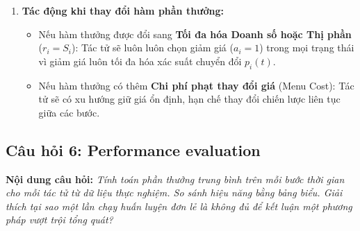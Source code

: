 \documentclass[12pt,a4paper]{article}
\begin{document}
\begin{enumerate}
    \item \textbf{Tác động khi thay đổi hàm phần thưởng:}
    \begin{itemize}
        \item Nếu hàm thưởng được đổi sang \textbf{Tối đa hóa Doanh số hoặc Thị phần} ($r_i = S_i$): Tác tử sẽ luôn luôn chọn giảm giá ($a_i = 1$) trong mọi trạng thái vì giảm giá luôn tối đa hóa xác suất chuyển đổi $p_i(t)$.
        \item Nếu hàm thưởng có thêm \textbf{Chi phí phạt thay đổi giá} (Menu Cost): Tác tử sẽ có xu hướng giữ giá ổn định, hạn chế thay đổi chiến lược liên tục giữa các bước.
    \end{itemize}
\end{enumerate}

\subsection{Câu hỏi 6: Performance evaluation}
\textbf{Nội dung câu hỏi:} \textit{Tính toán phần thưởng trung bình trên mỗi bước thời gian cho mỗi tác tử từ dữ liệu thực nghiệm. So sánh hiệu năng bằng bảng biểu. Giải thích tại sao một lần chạy huấn luyện đơn lẻ là không đủ để kết luận một phương pháp vượt trội tổng quát?}
\end{document}
